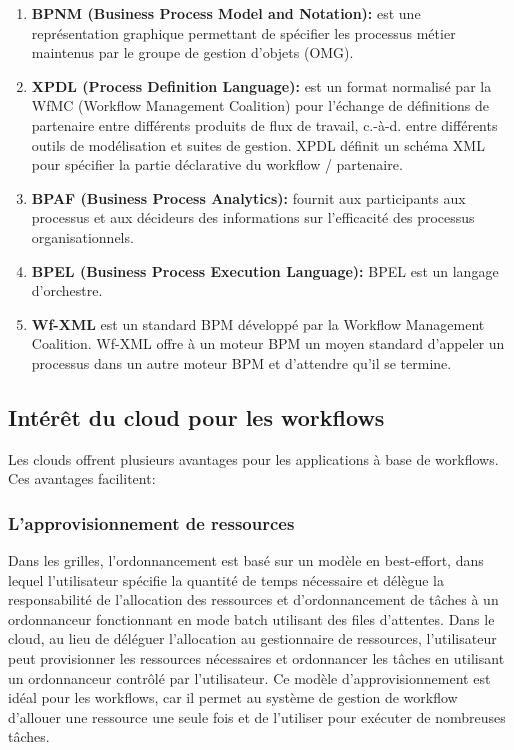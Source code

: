 \begin{enumerate}
\item \textbf{ BPNM (Business Process Model and Notation):} est une représentation graphique permettant de spécifier les processus métier maintenus par le groupe de gestion d'objets (OMG). 
\item \textbf{XPDL (Process Definition Language):} est un format normalisé par la WfMC (Workflow Management Coalition) pour l’échange de définitions de partenaire entre différents produits de flux de travail, c.-à-d. entre différents outils de modélisation et suites de gestion. XPDL définit un schéma XML pour spécifier la partie déclarative du workflow / partenaire.
\item \textbf{BPAF (Business Process Analytics):} fournit aux participants aux processus et aux décideurs des informations sur l'efficacité des processus organisationnels.
\item \textbf{BPEL (Business Process Execution Language):} BPEL est un langage d'orchestre.
\item \textbf{ Wf-XML }est un standard BPM développé par la Workflow Management Coalition. Wf-XML offre à un moteur BPM un moyen standard d'appeler un processus dans un autre moteur BPM et d'attendre qu'il se termine.
\end{enumerate}



\subsection{ Intérêt du cloud pour les workflows }
Les clouds offrent plusieurs avantages pour les applications à base de workflows. 
Ces avantages facilitent: 
\subsubsection{L’approvisionnement de ressources }
Dans les grilles, l'ordonnancement est basé sur un modèle en best-effort, dans lequel l’utilisateur spécifie la quantité de temps nécessaire et délègue la responsabilité de l'allocation des ressources et d'ordonnancement de tâches à un ordonnanceur fonctionnant en mode batch utilisant des files d’attentes. Dans le cloud, au lieu de déléguer l’allocation au gestionnaire de ressources, l'utilisateur peut provisionner les ressources nécessaires et ordonnancer les tâches en utilisant un ordonnanceur contrôlé par l'utilisateur. Ce modèle d’approvisionnement est idéal pour les workflows, car il permet au système de gestion de workflow d'allouer une ressource une seule fois et de l'utiliser pour exécuter de nombreuses tâches. 
